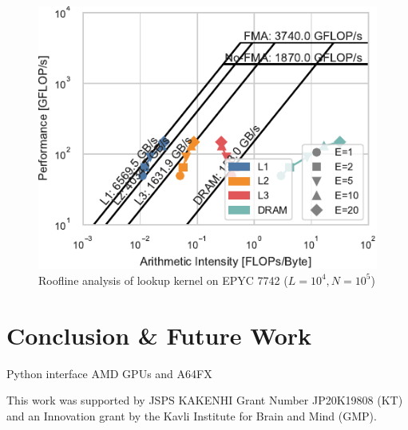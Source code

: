 \documentclass[sigconf]{acmart}
\begin{document}
\begin{figure}
    \centering
    \includegraphics{figs/roofline_lookup_wo_rho_epyc}
    \caption{Roofline analysis of lookup kernel on EPYC 7742 ($L=10^4, N=10^5$)}%
    \label{fig:roofline-lookup-eypc}
\end{figure}

\section{Conclusion \& Future Work}\label{sec:conclusion}

Python interface
AMD GPUs and A64FX

\begin{acks}
This work was supported by JSPS KAKENHI Grant Number JP20K19808 (KT) and an
Innovation grant by the Kavli Institute for Brain and Mind (GMP).
\end{acks}

\clearpage



\end{document}
